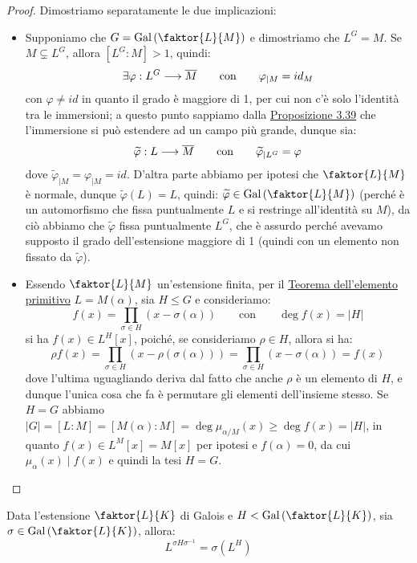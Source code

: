 \documentclass[11pt]{scrartcl}
\begin{document}
\begin{proof}
    Dimostriamo separatamente le due implicazioni:
    \begin{itemize}
        \item Supponiamo che $G = \Gal\left(\faktor{L}{M}\right)$ e dimostriamo che $L^G = M$. Se $M \subsetneq L^G$, allora $[L^G : M]>1$, quindi:
        \[ \exists\varphi : L^G \longrightarrow \overline M \qquad \text{con} \qquad \varphi_{|M} = id_M
            \]
        con $\varphi \ne id$ in quanto il grado è maggiore di 1, per cui non c'è solo l'identità tra le immersioni; a questo punto sappiamo dalla \hyperref[3.39]{Proposizione 3.39} che l'immersione si può estendere ad 
        un campo più grande, dunque sia:
        \[ \widetilde{\varphi} : L \longrightarrow \overline M \qquad \text{con} \qquad \widetilde{\varphi}_{|L^G} = \varphi
            \]
        dove $\widetilde{\varphi}_{|M} = \varphi_{|M} = id$. D'altra parte abbiamo per ipotesi che $\faktor{L}{M}$ è normale, dunque $\widetilde{\varphi}(L) = L$, quindi:
        $\widetilde{\varphi} \in \Gal\left(\faktor{L}{M}\right)$ (perché è un automorfismo che fissa puntualmente $L$ e si restringe all'identità su $M$), da ciò abbiamo che $\widetilde{\varphi}$ fissa puntualmente
        $L^G$, che è assurdo perché avevamo supposto il grado dell'estensione maggiore di 1 (quindi con un elemento non fissato da $\widetilde{\varphi}$).
        \item Essendo $\faktor{L}{M}$ un'estensione finita, per il \hyperref[prim]{Teorema dell'elemento primitivo} $L = M(\alpha)$, sia $H \leqslant G$ e consideriamo:
        \[ f(x) = \prod_{\sigma \in H}(x - \sigma(\alpha)) \qquad \text{con} \qquad \deg f(x) = |H|
            \]
        si ha $f(x) \in L^H[x]$, poiché, se consideriamo $\rho \in H$, allora si ha:
        \[ \rho f(x) = \prod_{\sigma \in H}(x - \rho(\sigma(\alpha))) = \prod_{\sigma \in H}(x - \sigma(\alpha)) = f(x)
            \]
        dove l'ultima uguagliando deriva dal fatto che anche $\rho$ è un elemento di $H$, e dunque l'unica cosa che fa è permutare gli elementi dell'insieme stesso. Se $H = G$
        abbiamo $|G| = [L : M] = [M(\alpha) : M] = \deg \mu_{\alpha/M}(x) \geq \deg f(x) = |H|$, in quanto $f(x) \in L^M[x] = M[x]$ per ipotesi e $f(\alpha) = 0$, da cui $\mu_\alpha(x) \mid f(x)$ e quindi la tesi $H = G$.
    \end{itemize}
\end{proof}

\begin{lemma}
    \label{3.68}
    Data l'estensione $\faktor{L}{K}$ di Galois e $H < \Gal\left(\faktor{L}{K}\right)$, sia $\sigma \in \Gal\left(\faktor{L}{K}\right)$, allora:
    \[ L^{\sigma H \sigma^{-1}} = \sigma(L^H)
        \]
\end{lemma}
\end{document}
